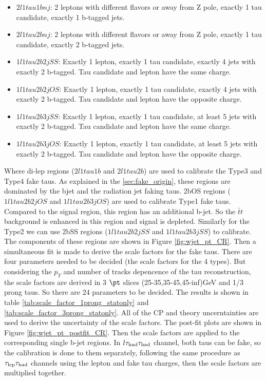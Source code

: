 \begin{itemize}
\item{$2l1tau1bnj$: 2 leptons with different flavors or away from Z pole, exactly 1 tau candidate,  exactly 1 b-tagged jets.}
\item{$2l1tau2bnj$: 2 leptons with different flavors or away from Z pole, exactly 1 tau candidate,  exactly 2 b-tagged jets.}
\item{$1l1tau2b2j SS$: Exactly 1 lepton, exactly 1 tau candidate, exactly 4 jets with exactly 2 b-tagged. Tau candidate and lepton have the same charge.}
\item{$1l1tau2b2j OS$: Exactly 1 lepton, exactly 1 tau candidate, exactly 4 jets with exactly 2 b-tagged. Tau candidate and lepton have the opposite charge.}
\item{$1l1tau2b3j SS$: Exactly 1 lepton, exactly 1 tau candidate, at least 5 jets with exactly 2 b-tagged. Tau candidate and lepton have the same charge.}
\item{$1l1tau2b3j OS$: Exactly 1 lepton, exactly 1 tau candidate, at least 5 jets with exactly 2 b-tagged. Tau candidate and lepton have the opposite charge.}
\end{itemize}

Where di-lep regions ($2l1tau1b$ and $2l1tau2b$) are used to calibrate the Type3 and Type4 fake taus. As explained in the \ref{sec:fake_origin}, these regions are dominated by the bjet and the radiation jet faking taus. 2bOS regions ($1l1tau2b2j OS$ and $1l1tau2b3j OS$) are used to calibrate Type1 fake taus. Compared to the signal region, this region has an additional b-jet. So the $\bar{t}t$ background is enhanced in this region and signal is depleted. Similarly for the Type2 we can use 2bSS regions ($1l1tau2b2j SS$ and $1l1tau2b3j SS$) to calibrate. The components of these regions are shown in Figure \ref{fig:wjet_pt_CR}. Then a simultaneous fit is made to derive the scale factors for the fake taus. There are four parameters needed to be decided (the scale factors for the 4 types). But considering the $p_{T}$ and number of tracks depencence of the tau reconstruction, the scale factors are derived in 3 $\pt$ slices (25-35,35-45,45-inf)GeV and 1/3 prong taus. So there are 24 parameters to be decided. The results is shown in table \ref{tab:scale_factor_1prong_statonly} and \ref{tab:scale_factor_3prong_statonly}. All of the CP and theory uncerntainties are used to derive the uncertainty of the scale factors. The post-fit plots are shown in Figure \ref{fig:wjet_pt_postfit_CR}. Then the scale factors are applied to the corresponding single b-jet regions. In $l\tau_\text{had}{}\tau_\text{had}$ channel, both taus can be fake, so the calibration is done to them separately, following the same procedure as $\tau_\text{lep}{}\tau_\text{had}$ channels using the lepton and fake tau charges, then the scale factors are multiplied together.

